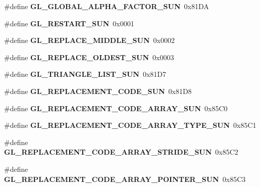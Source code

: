 \begin{DoxyCompactItemize}
\item 
\#define {\bfseries G\+L\+\_\+\+G\+L\+O\+B\+A\+L\+\_\+\+A\+L\+P\+H\+A\+\_\+\+F\+A\+C\+T\+O\+R\+\_\+\+S\+U\+N}~0x81\+D\+A\label{_s_d_l__opengl_8h_a5b5c02b7caafd4b8633cb351165c025b}

\item 
\#define {\bfseries G\+L\+\_\+\+R\+E\+S\+T\+A\+R\+T\+\_\+\+S\+U\+N}~0x0001\label{_s_d_l__opengl_8h_af03f23b8693cc5138590fb5d2d471c61}

\item 
\#define {\bfseries G\+L\+\_\+\+R\+E\+P\+L\+A\+C\+E\+\_\+\+M\+I\+D\+D\+L\+E\+\_\+\+S\+U\+N}~0x0002\label{_s_d_l__opengl_8h_ae4a36d932b98b9baad12699fde6fc5bc}

\item 
\#define {\bfseries G\+L\+\_\+\+R\+E\+P\+L\+A\+C\+E\+\_\+\+O\+L\+D\+E\+S\+T\+\_\+\+S\+U\+N}~0x0003\label{_s_d_l__opengl_8h_a2e714c5c9a9c2402d673ff1920b64303}

\item 
\#define {\bfseries G\+L\+\_\+\+T\+R\+I\+A\+N\+G\+L\+E\+\_\+\+L\+I\+S\+T\+\_\+\+S\+U\+N}~0x81\+D7\label{_s_d_l__opengl_8h_a9c5f6331384a5b3d1e00d9ffa7bc7541}

\item 
\#define {\bfseries G\+L\+\_\+\+R\+E\+P\+L\+A\+C\+E\+M\+E\+N\+T\+\_\+\+C\+O\+D\+E\+\_\+\+S\+U\+N}~0x81\+D8\label{_s_d_l__opengl_8h_ad08ecd4da67bec8849db86f5ed523742}

\item 
\#define {\bfseries G\+L\+\_\+\+R\+E\+P\+L\+A\+C\+E\+M\+E\+N\+T\+\_\+\+C\+O\+D\+E\+\_\+\+A\+R\+R\+A\+Y\+\_\+\+S\+U\+N}~0x85\+C0\label{_s_d_l__opengl_8h_a14d1788c9ec11b7a574a4d8c5731330e}

\item 
\#define {\bfseries G\+L\+\_\+\+R\+E\+P\+L\+A\+C\+E\+M\+E\+N\+T\+\_\+\+C\+O\+D\+E\+\_\+\+A\+R\+R\+A\+Y\+\_\+\+T\+Y\+P\+E\+\_\+\+S\+U\+N}~0x85\+C1\label{_s_d_l__opengl_8h_ae7e225c487eff1fd0780eda26fa7fe62}

\item 
\#define {\bfseries G\+L\+\_\+\+R\+E\+P\+L\+A\+C\+E\+M\+E\+N\+T\+\_\+\+C\+O\+D\+E\+\_\+\+A\+R\+R\+A\+Y\+\_\+\+S\+T\+R\+I\+D\+E\+\_\+\+S\+U\+N}~0x85\+C2\label{_s_d_l__opengl_8h_a4bc0c40015f2bdd737ced009d55a1400}

\item 
\#define {\bfseries G\+L\+\_\+\+R\+E\+P\+L\+A\+C\+E\+M\+E\+N\+T\+\_\+\+C\+O\+D\+E\+\_\+\+A\+R\+R\+A\+Y\+\_\+\+P\+O\+I\+N\+T\+E\+R\+\_\+\+S\+U\+N}~0x85\+C3\label{_s_d_l__opengl_8h_ac5c1c0e6709232af0d5c92d68a815ff9}


\end{DoxyCompactItemize}
